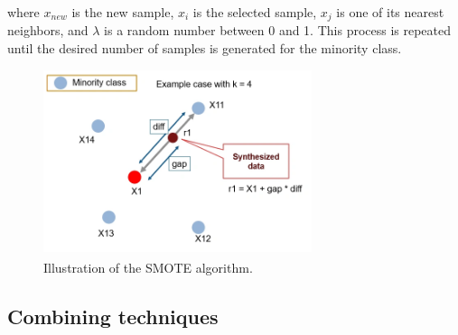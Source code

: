 where $x_{new}$ is the new sample, $x_{i}$ is the selected sample, $x_{j}$ is one of its nearest neighbors, and $\lambda$ is a random number
between 0 and 1. This process is repeated until the desired number of samples is generated for the minority class.

\begin{figure}[htbp!]
	\centering
	\includegraphics[width=0.7\textwidth]{../imgs/smote.png}
	\caption{Illustration of the SMOTE algorithm.\textsuperscript{\cite{analyticsvidhya-2020}}}
	\label{fig:smote}
\end{figure}

\label{subsubsec:results_data_augmentation}



\subsection{Combining techniques}
\label{subsec:combining_techniques}

\label{subsubsec:results_combining_techniques}